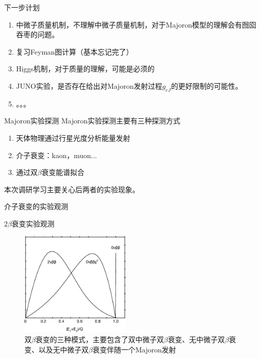\documentclass[11pt]{beamer}
\begin{document}
\begin{frame}{下一步计划}
\begin{enumerate}
\item {中微子质量机制，不理解中微子质量机制，对于Majoron模型的理解会有囫囵吞枣的问题。}
\item {复习Feyman图计算（基本忘记完了）}
\item {Higgs机制，对于质量的理解，可能是必须的}
\item {JUNO实验，是否存在给出对Majoron发射过程$g_{eJ}$的更好限制的可能性。}
\item {。。。}
\end{enumerate}
\end{frame}

\begin{frame}{Majoron实验探测}
Majoron实验探测主要有三种探测方式
\begin{enumerate}
\item {天体物理通过行星光度分析能量发射}
\item {介子衰变：kaon，muon...}
\item {通过双$\beta$衰变能谱拟合}
\end{enumerate}
本次调研学习主要关心后两者的实验现象。
\end{frame}

\begin{frame}{介子衰变的实验观测}

\end{frame}

\begin{frame}{$2\beta$衰变实验观测}
\begin{figure}[H]
 \centering
 \includegraphics[height=5cm]{pic/2nubeta.pdf}
 \caption{双$\beta$衰变的三种模式，主要包含了双中微子双$\beta$衰变、无中微子双$\beta$衰变、以及无中微子双$\beta$衰变伴随一个Majoron发射\cite{Gomez-Cadenas:2015twa}}
 \label{fig:2nubeta}
\end{figure}
\end{frame}



\end{document}
